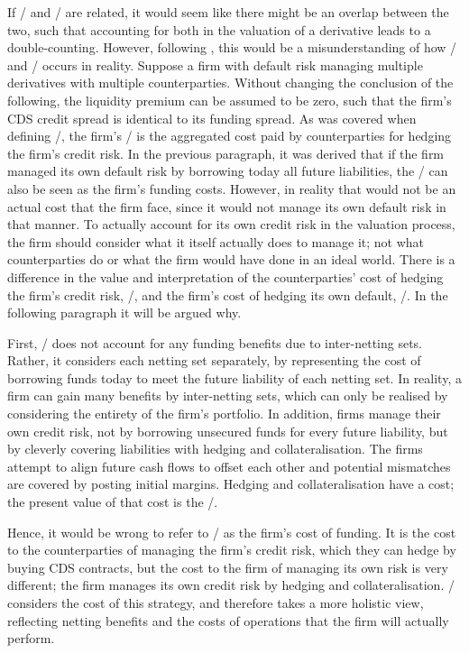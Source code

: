 \documentclass[main.tex]{subfiles}
\begin{document}
    If \DVA/ and \FVA/ are related, it would seem like there might be an overlap between the two,
    such that accounting for both in the valuation of a derivative leads to a double-counting.
    However, following \textcite{Ruiz2015XVA}, 
    this would be a misunderstanding of how \DVA/ and \FVA/ occurs in reality.
    Suppose a firm with default risk managing multiple derivatives with multiple counterparties.
    Without changing the conclusion of the following, 
    the liquidity premium can be assumed to be zero, 
    such that the firm's CDS credit spread is identical to its funding spread.
    As was covered when defining \DVA/, the firm's \DVA/ is the aggregated cost
    paid by counterparties for hedging the firm's credit risk.
    In the previous paragraph, it was derived that if the firm managed its own default risk 
    by borrowing today all future liabilities,
    the \DVA/ can also be seen as the firm's funding costs.
    However, in reality that would not be an actual cost that the firm face,
    since it would not manage its own default risk in that manner.
    To actually account for its own credit risk in the valuation process,
    the firm should consider what it itself actually does to manage it;
    not what counterparties do or what the firm would have done in an ideal world.
    There is a difference in the value and interpretation 
    of the counterparties' cost of hedging the firm's credit risk, \DVA/,
    and the firm's cost of hedging its own default, \FVA/.
    In the following paragraph it will be argued why.

    First, \DVA/ does not account for any funding benefits due to inter-netting sets.
    Rather, it considers each netting set separately, by representing the cost 
    of borrowing funds today to meet the future liability of each netting set.
    In reality, a firm can gain many benefits by inter-netting sets,
    which can only be realised by considering the entirety of the firm's portfolio.
    In addition, firms manage their own credit risk,
    not by borrowing unsecured funds for every future liability,
    but by cleverly covering liabilities
    with hedging and collateralisation.
    The firms attempt to align future cash flows to offset each other
    and potential mismatches are covered by posting initial margins. 
    Hedging and collateralisation have a cost; 
    the present value of that cost is the \FVA/.

    Hence, it would be wrong to refer to \DVA/ as the firm's cost of funding.
    It is the cost to the counterparties of managing the firm's credit risk,
    which they can hedge by buying CDS contracts,
    but the cost to the firm of managing its own risk is very different;
    the firm manages its own credit risk by hedging and collateralisation.
    \FVA/ considers the cost of this strategy, and therefore takes a more holistic view, 
    reflecting netting benefits and the costs of operations that the firm will actually perform.
\end{document}

